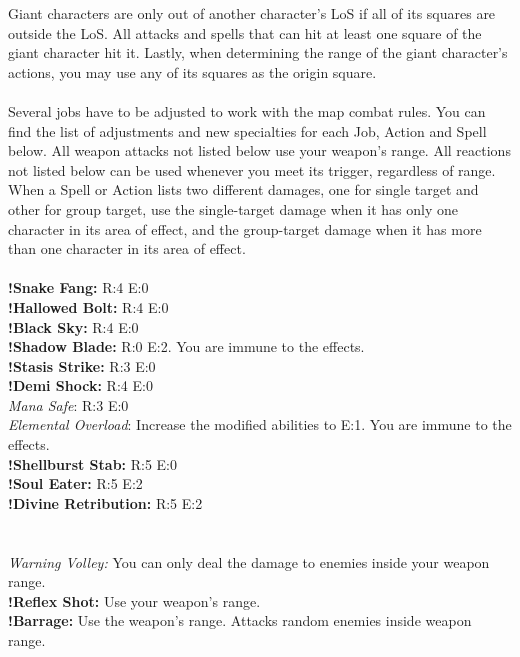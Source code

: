 Giant characters are only out of another character’s LoS if all of its squares are outside the LoS. All attacks and spells that can hit at least one square of the giant character hit it. 
Lastly, when determining the range of the giant character’s actions, you may use any of its squares as the origin square.
%
\\\\
%
 Several jobs have to be adjusted to work with the map combat rules. 
You can find the list of adjustments and new specialties for each Job, Action and Spell below. 
All weapon attacks not listed below use your weapon’s range. 
All reactions not listed below can be used whenever you meet its trigger, regardless of range. 
When a Spell or Action lists two different damages, one for single target and other for group target, use the single-target damage when it has only one character in its area of effect, and the group-target damage when it has more than one character in its area of effect.
%
\\\\
%
%
 \ofrow
\textbf{!Snake Fang:} R:4 E:0\\
\textbf{!Hallowed Bolt:} R:4 E:0\\
\textbf{!Black Sky:} R:4 E:0\\
\textbf{!Shadow Blade:} R:0 E:2. You are immune to the effects.\\
\textbf{!Stasis Strike:} R:3 E:0\\
\textbf{!Demi Shock:} R:4 E:0\\
\textit{Mana Safe}: R:3 E:0	\\
\textit{Elemental Overload}: Increase the modified abilities to E:1. You are immune to the effects.	\\
\textbf{!Shellburst Stab:} R:5 E:0\\
\textbf{!Soul Eater:} R:5 E:2\\
\textbf{!Divine Retribution:} R:5 E:2\\
%
\\\\
%
 \ofrow
\textit{Warning Volley:} You can only deal the damage to enemies inside your weapon range.\\
\textbf{!Reflex Shot:} Use your weapon’s range.\\
\textbf{!Barrage:} Use the weapon’s range. Attacks random enemies inside weapon range.\\
%
\\\\
